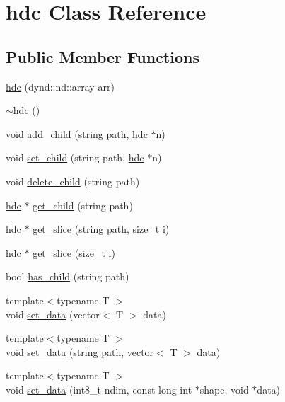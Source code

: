 \hypertarget{classhdc}{}\section{hdc Class Reference}
\label{classhdc}
\subsection*{Public Member Functions}
\begin{DoxyCompactItemize}
\item 
\hyperlink{classhdc_a0dd2786f4236f02ac3c5895a9f9dc0fd}{hdc} (dynd\+::nd\+::array arr)
\item 
\hyperlink{classhdc_a18f8ee62caf1d5ae22d65d9dd330f9cc}{$\sim$hdc} ()
\item 
void \hyperlink{classhdc_a6ae2658ee66a5f4fb0d0d6535b36c5b2}{add\+\_\+child} (string path, \hyperlink{classhdc}{hdc} $\ast$n)
\item 
void \hyperlink{classhdc_acde60e58222d3b7d2b2a53b14289f500}{set\+\_\+child} (string path, \hyperlink{classhdc}{hdc} $\ast$n)
\item 
void \hyperlink{classhdc_af2b7f95b9cf36d26e0fc20dd1c0465ba}{delete\+\_\+child} (string path)
\item 
\hyperlink{classhdc}{hdc} $\ast$ \hyperlink{classhdc_aafcd7c001cf4d3e2d61dbbf6efef6e08}{get\+\_\+child} (string path)
\item 
\hyperlink{classhdc}{hdc} $\ast$ \hyperlink{classhdc_a580b1c84ebb50da63e2682ddceb6010a}{get\+\_\+slice} (string path, size\+\_\+t i)
\item 
\hyperlink{classhdc}{hdc} $\ast$ \hyperlink{classhdc_a1ef96265e222ef9acc07c151b20af8bf}{get\+\_\+slice} (size\+\_\+t i)
\item 
bool \hyperlink{classhdc_aee70cadad065fa643d8313e068734e59}{has\+\_\+child} (string path)
\item 
{\footnotesize template$<$typename T $>$ }\\void \hyperlink{classhdc_a120de413f9264db573e7c54aa49ae489}{set\+\_\+data} (vector$<$ T $>$ data)
\item 
{\footnotesize template$<$typename T $>$ }\\void \hyperlink{classhdc_a9462ce2e878c8e978e38a9f71188973b}{set\+\_\+data} (string path, vector$<$ T $>$ data)
\item 
{\footnotesize template$<$typename T $>$ }\\void \hyperlink{classhdc_a42e2debec93119c4e79ddefb49ff5c43}{set\+\_\+data} (int8\+\_\+t ndim, const long int $\ast$shape, void $\ast$data)

\end{DoxyCompactItemize}
